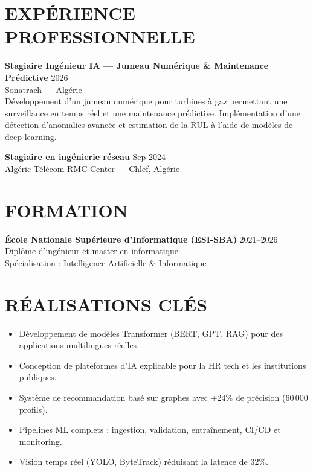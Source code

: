 \documentclass[a4paper,12pt]{article}
\begin{document}
\section{EXPÉRIENCE PROFESSIONNELLE}
\textbf{Stagiaire Ingénieur IA — Jumeau Numérique \& Maintenance Prédictive} \hfill 2026 \\
Sonatrach — Algérie \\
Développement d’un jumeau numérique pour turbines à gaz permettant une surveillance en temps réel et une maintenance prédictive. Implémentation d’une détection d’anomalies avancée et estimation de la RUL à l’aide de modèles de deep learning.

\textbf{Stagiaire en ingénierie réseau} \hfill Sep 2024 \\
Algérie Télécom RMC Center — Chlef, Algérie

\section{FORMATION}
\textbf{École Nationale Supérieure d’Informatique (ESI-SBA)} \hfill 2021--2026 \\
Diplôme d’ingénieur et master en informatique \\
Spécialisation : Intelligence Artificielle \& Informatique

\section{RÉALISATIONS CLÉS}
\begin{itemize}
    \item Développement de modèles Transformer (BERT, GPT, RAG) pour des applications multilingues réelles.
    \item Conception de plateformes d’IA explicable pour la HR tech et les institutions publiques.
    \item Système de recommandation basé sur graphes avec +24\% de précision (60\,000 profils).
    \item Pipelines ML complets : ingestion, validation, entraînement, CI/CD et monitoring.
    \item Vision temps réel (YOLO, ByteTrack) réduisant la latence de 32\%.
\end{itemize}

\newpage

\end{document}
